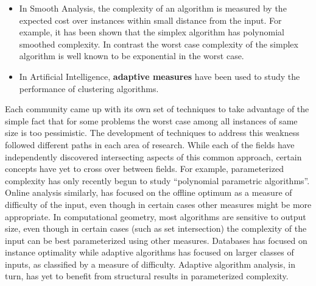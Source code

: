 \begin{itemize}
\item In Smooth Analysis, the complexity of an algorithm is measured
  by the expected cost over instances within small distance from the
  input. For example, it has been shown that the simplex algorithm has
  polynomial smoothed complexity. In contrast the worst case
  complexity of the simplex algorithm is well known to be exponential
  in the worst case.

\item In Artificial Intelligence, {\bf adaptive measures} have been
  used to study the performance of clustering algorithms.
\end{itemize}


Each community came up with its own set of techniques to take
advantage of the simple fact that for some problems the worst case
among all instances of same size is too pessimistic.
%
The development of techniques to address this weakness 
followed different paths in each area of research.
%
While each of the fields have independently discovered intersecting 
aspects of this common approach, certain concepts have yet to cross
over between fields. 
%
For example, parameterized complexity has only recently begun to study
``polynomial parametric algorithms''. 
%
Online analysis similarly, has focused on the offline optimum as a
measure of difficulty of the input, even though in certain cases other
measures might be more appropriate. 
%
In computational geometry, most algorithms are sensitive to output
size, even though in certain cases (such as set intersection) the
complexity of the input can be best parameterized using other
measures.
%
Databases has focused on instance optimality while adaptive algorithms
has focused on larger classes of inputs, as classified by a measure of
difficulty. 
%
Adaptive algorithm analysis, in turn, has yet to benefit from
structural results in parameterized complexity.



